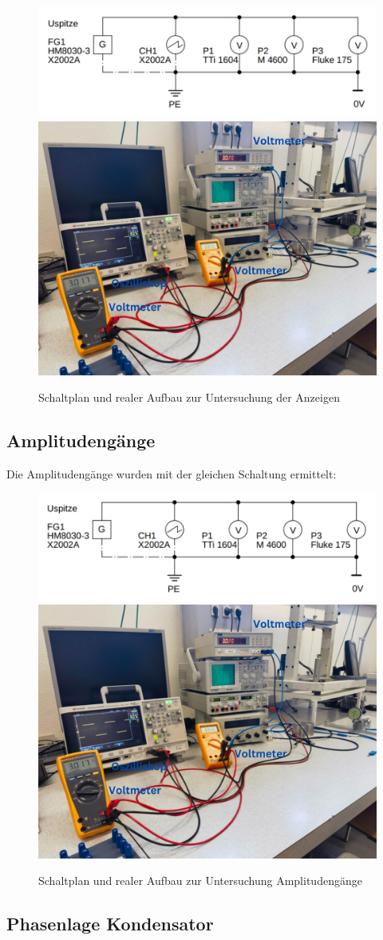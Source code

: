 \documentclass[12pt,a4paper,twoside]{article}
\begin{document}
\begin{figure}[H]
    \centering
    \includegraphics[width=0.4\linewidth]{nudes/Schaltplan1.PNG}
    \includegraphics[width=0.4\linewidth]{nudes/PhaseLeistungBilder/Aufbau1,2.jpg}
    \caption{Schaltplan und realer Aufbau zur Untersuchung der Anzeigen}
    \label{fig:Aufbau1}
\end{figure}


\subsection{Amplitudengänge}

Die Amplitudengänge wurden mit der gleichen Schaltung ermittelt:

\begin{figure}[H]
    \centering
    \includegraphics[width=0.4\linewidth]{nudes/Schaltplan2.PNG}
    \includegraphics[width=0.4\linewidth]{nudes/PhaseLeistungBilder/Aufbau1,2.jpg}    
    \caption{Schaltplan und realer Aufbau zur Untersuchung Amplitudengänge}
    \label{fig:Aufbau2}
\end{figure}

\subsection{Phasenlage Kondensator}
\end{document}

